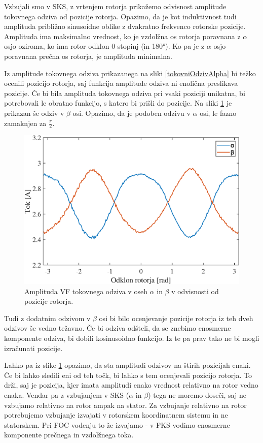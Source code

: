\documentclass[a4paper,twoside,openright,12pt,slovene]{book}
\begin{document}
Vzbujali smo v SKS, z vrtenjem rotorja prikažemo odvisnost amplitude tokovnega odziva od pozicije rotorja. Opazimo, da je kot induktivnost tudi amplituda približno sinusoidne oblike z dvakratno
frekvenco rotorske pozicije. Amplituda ima maksimalno vrednost, ko je vzdolžna os rotorja poravnana z $\alpha$ osjo oziroma, ko ima rotor odklon 0 stopinj (in 180°). Ko pa je z $\alpha$ osjo 
poravnana prečna os rotorja, je amplituda minimalna.  

Iz amplitude tokovnega odziva prikazanega na sliki \ref{tokovniOdzivAlpha} bi težko ocenili pozicijo rotorja, saj funkcija amplitude odziva ni enolična preslikava pozicije. Če bi bila amplituda
tokovnega odziva pri vsaki poziciji unikatna, bi potrebovali le obratno funkcijo, s katero bi prišli do pozicije. Na sliki \ref{tokovniOdzivAlphaBeta} je prikazan še odziv v $\beta$ osi. Opazimo, da
je podoben odzivu v $\alpha$ osi, le fazno zamaknjen za $\frac{\pi}{2}$. 

\begin{figure}[!htbp]
    \centering
    \includegraphics[width=0.9\columnwidth]{Slike/tokovniOdzivAlphaBeta.eps}
    \caption{\label{tokovniOdzivAlphaBeta} Amplituda VF tokovnega odziva v oseh $\alpha$ in $\beta$ v odvisnosti od pozicije rotorja.}
\end{figure}

Tudi z dodatnim odzivom v $\beta$ osi bi bilo ocenjevanje pozicije rotorja iz teh dveh odzivov še vedno težavno. Če bi odziva odšteli, da se znebimo enosmerne komponente odziva, bi dobili kosinusoidno
funkcijo. Iz te pa prav tako ne bi mogli izračunati pozicije. 

Lahko pa iz slike \ref{tokovniOdzivAlphaBeta} opazimo, da sta amplitudi odzivov na štirih pozicijah enaki. Če bi lahko sledili eni od teh točk, bi lahko s tem ocenjevali pozicijo rotorja. To drži, saj
je pozicija, kjer imata amplitudi enako vrednost relativno na rotor vedno enaka. Vendar pa z vzbujanjem v SKS ($\alpha$ in $\beta$) tega ne moremo doseči, saj ne vzbujamo relativno na rotor ampak na
stator. Za vzbujanje relativno na rotor potrebujemo vzbujanje izvajati v rotorskem koordinatnem sistemu in ne statorskem. Pri FOC vodenju to že izvajamo - v FKS vodimo enosmerne komponente prečnega in
vzdolžnega toka. 
\end{document}
